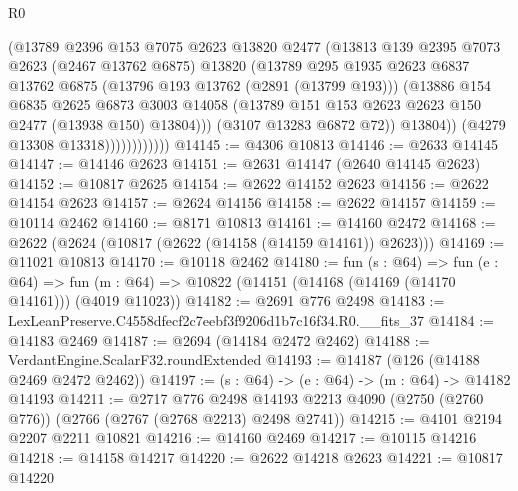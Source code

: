 \begin{lexlean}{R0}
\begin{coremodule}
                            (@13789
                              @2396
                              @153
                              @7075
                              @2623
                              @13820
                              @2477
                              (@13813
                                @139
                                @2395
                                @7073
                                @2623
                                (@2467 @13762 @6875)
                                @13820
                                (@13789
                                  @295
                                  @1935
                                  @2623
                                  @6837
                                  @13762
                                  @6875
                                  (@13796 @193 @13762 (@2891 (@13799 @193)))
                                  (@13886
                                    @154
                                    @6835
                                    @2625
                                    @6873
                                    @3003
                                    @14058
                                    (@13789 @151 @153 @2623 @2623 @150 @2477 (@13938 @150) @13804)))
                                (@3107 @13283 @6872 @72))
                              @13804))
                          (@4279 @13308 @13318))))))))))))
@14145 := @4306 @10813
@14146 := @2633 @14145
@14147 := @14146 @2623
@14151 := @2631 @14147 (@2640 @14145 @2623)
@14152 := @10817 @2625
@14154 := @2622 @14152 @2623
@14156 := @2622 @14154 @2623
@14157 := @2624 @14156
@14158 := @2622 @14157
@14159 := @10114 @2462
@14160 := @8171 @10813
@14161 := @14160 @2472
@14168 := @2622 (@2624 (@10817 (@2622 (@14158 (@14159 @14161)) @2623)))
@14169 := @11021 @10813
@14170 := @10118 @2462
@14180 := fun (s : @64) =>
  fun (e : @64) => fun (m : @64) => @10822 (@14151 (@14168 (@14169 (@14170 @14161))) (@4019 @11023))
@14182 := @2691 @776 @2498
@14183 := LexLeanPreserve.C4558dfecf2c7eebf3f9206d1b7c16f34.R0.__fits_37
@14184 := @14183 @2469
@14187 := @2694 (@14184 @2472 @2462)
@14188 := VerdantEngine.ScalarF32.roundExtended
@14193 := @14187 (@126 (@14188 @2469 @2472 @2462))
@14197 := (s : @64) -> (e : @64) -> (m : @64) -> @14182 @14193
@14211 := @2717
    @776
    @2498
    @14193
    @2213
    @4090
    (@2750 (@2760 @776))
    (@2766 (@2767 (@2768 @2213) @2498 @2741))
@14215 := @4101 @2194 @2207 @2211 @10821
@14216 := @14160 @2469
@14217 := @10115 @14216
@14218 := @14158 @14217
@14220 := @2622 @14218 @2623
@14221 := @10817 @14220

\end{coremodule}
\end{lexlean}
